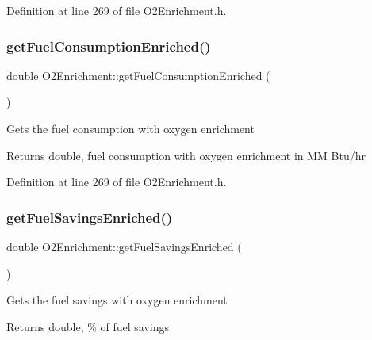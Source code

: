Definition at line 269 of file O2\+Enrichment.\+h.

\mbox{\label{class_o2_enrichment_aaf0dae071145b439e995d90f838878a7}} 
\subsubsection{\texorpdfstring{get\+Fuel\+Consumption\+Enriched()}{getFuelConsumptionEnriched()}\hspace{0.1cm}{\footnotesize\ttfamily [3/3]}}
{\footnotesize\ttfamily double O2\+Enrichment\+::get\+Fuel\+Consumption\+Enriched (\begin{DoxyParamCaption}{ }\end{DoxyParamCaption})\hspace{0.3cm}{\ttfamily [inline]}}

Gets the fuel consumption with oxygen enrichment \begin{DoxyReturn}{Returns}
double, fuel consumption with oxygen enrichment in MM Btu/hr 
\end{DoxyReturn}


Definition at line 269 of file O2\+Enrichment.\+h.

\mbox{\label{class_o2_enrichment_a2aa9f8d3a02935931e705f82ae57c72f}} 
\subsubsection{\texorpdfstring{get\+Fuel\+Savings\+Enriched()}{getFuelSavingsEnriched()}\hspace{0.1cm}{\footnotesize\ttfamily [1/3]}}
{\footnotesize\ttfamily double O2\+Enrichment\+::get\+Fuel\+Savings\+Enriched (\begin{DoxyParamCaption}{ }\end{DoxyParamCaption})\hspace{0.3cm}{\ttfamily [inline]}}

Gets the fuel savings with oxygen enrichment \begin{DoxyReturn}{Returns}
double, \% of fuel savings 
\end{DoxyReturn}


